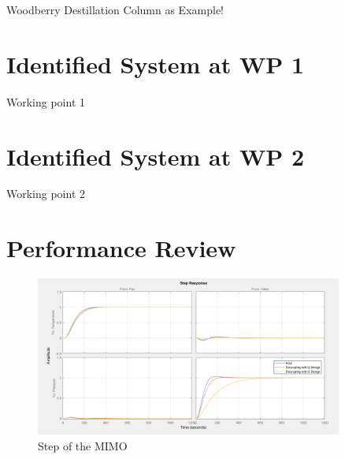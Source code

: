 Woodberry Destillation Column as Example!

\section{Identified System at WP 1}%
\label{c:fotd:s:wp1}

Working point 1

\section{Identified System at WP 2}%
\label{c:fotd:s:wp1}

Working point 2

\section{Performance Review} %
\label{c:fotd:s:performance_review}

\begin{figure}[H]
\begin{minipage}[b]{\textwidth}
\centering
\includegraphics[width=0.9\textwidth]{./Graphics/Step_MATLAB.png}
\caption{Step of the MIMO}
\label{c:fotd:f:mimo_step}
\end{minipage}
\end{figure}

